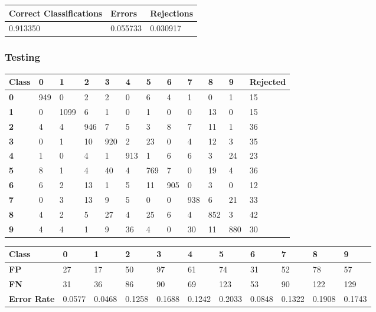 \documentclass[
  a4paper,            %
  DIV=10,             %
  oneside,            %
  BCOR=5mm,           %
  parskip=half,       %
  numbers=noenddot,   %
  bibtotoc,           %
  listof=totoc,        %
  article
]{scrreprt}
\begin{document}
\begin{center}
  \begin{tabular}{|p{5cm}|p{3cm}|p{3cm}|}
    \hline
    \textbf{Correct Classifications} & \textbf{Errors} & \textbf{Rejections} \\
    \hline
    0.913350 & 0.055733 & 0.030917 \\
    \hline
  \end{tabular}
\end{center}
\subsubsection{Testing}
\begin{center}
  \begin{tabular}{|p{1cm}|p{1cm}|p{1cm}|p{1cm}|p{1cm}|p{1cm}|p{1cm}|p{1cm}|p{1cm}|p{1cm}|p{1cm}|p{1.7cm}|}
  \hline
  \textbf{Class} & \textbf{0} & \textbf{1} & \textbf{2} & \textbf{3} & \textbf{4} & \textbf{5} & \textbf{6} & \textbf{7} & \textbf{8} & \textbf{9} & \textbf{Rejected} \\
  \hline
  \textbf{0} & 949 & 0 & 2 & 2 & 0 & 6 & 4 & 1 & 0 & 1 & 15 \\
  \hline
  \textbf{1} & 0 & 1099 & 6 & 1 & 0 & 1 & 0 & 0 & 13 & 0 & 15 \\
  \hline
  \textbf{2} & 4 & 4 & 946 & 7 & 5 & 3 & 8 & 7 & 11 & 1 & 36 \\
  \hline
  \textbf{3} & 0 & 1 & 10 & 920 & 2 & 23 & 0 & 4 & 12 & 3 & 35 \\
  \hline
  \textbf{4} & 1 & 0 & 4 & 1 & 913 & 1 & 6 & 6 & 3 & 24 & 23 \\
  \hline
  \textbf{5} & 8 & 1 & 4 & 40 & 4 & 769 & 7 & 0 & 19 & 4 & 36 \\
  \hline
  \textbf{6} & 6 & 2 & 13 & 1 & 5 & 11 & 905 & 0 & 3 & 0 & 12 \\
  \hline
  \textbf{7} & 0 & 3 & 13 & 9 & 5 & 0 & 0 & 938 & 6 & 21 & 33 \\
  \hline
  \textbf{8} & 4 & 2 & 5 & 27 & 4 & 25 & 6 & 4 & 852 & 3 & 42 \\
  \hline
  \textbf{9} & 4 & 4 & 1 & 9 & 36 & 4 & 0 & 30 & 11 & 880 & 30 \\
  \hline
  \end{tabular}
\end{center}

\begin{center}
  \begin{tabular}{|p{1cm}|p{1cm}|p{1cm}|p{1cm}|p{1cm}|p{1cm}|p{1cm}|p{1cm}|p{1cm}|p{1cm}|p{1cm}|}
    \hline
    \textbf{Class} & \textbf{0} & \textbf{1} & \textbf{2} & \textbf{3} & \textbf{4} & \textbf{5} & \textbf{6} & \textbf{7} & \textbf{8} & \textbf{9} \\
    \hline
    \textbf{FP} & 27 & 17 & 50 & 97 & 61 & 74 & 31 & 52 & 78 & 57 \\
    \hline
    \textbf{FN} & 31 & 36 & 86 & 90 & 69 & 123 & 53 & 90 & 122 & 129 \\
    \hline
    \textbf{Error Rate} & 0.0577 & 0.0468 & 0.1258 & 0.1688 & 0.1242 & 0.2033 & 0.0848 & 0.1322 & 0.1908 & 0.1743 \\
    \hline
  \end{tabular}
\end{center}
\end{document}
